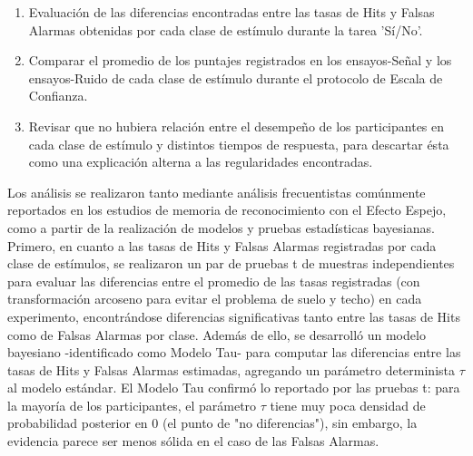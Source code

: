 \begin{enumerate}
	\item Evaluación de las diferencias encontradas entre las tasas de Hits y Falsas Alarmas obtenidas por cada clase de estímulo durante la tarea 'Sí/No'.\\
	\item Comparar el promedio de los puntajes registrados en los ensayos-Señal y los ensayos-Ruido de cada clase de estímulo durante el protocolo de Escala de Confianza.\\
	\item Revisar que no hubiera relación entre el desempeño de los participantes en cada clase de estímulo y distintos tiempos de respuesta, para descartar ésta como una explicación alterna a las regularidades encontradas.\\
\end{enumerate}

Los análisis se realizaron tanto mediante análisis frecuentistas comúnmente reportados en los estudios de memoria de reconocimiento con el Efecto Espejo, como a partir de la realización de modelos y pruebas estadísticas bayesianas.\\

Primero, en cuanto a las tasas de Hits y Falsas Alarmas registradas por cada clase de estímulos, se realizaron un par de pruebas t de muestras independientes para evaluar las diferencias entre el promedio de las tasas registradas (con transformación arcoseno para evitar el problema de suelo y techo) en cada experimento, encontrándose diferencias significativas tanto entre las tasas de Hits como de Falsas Alarmas por clase. Además de ello, se desarrolló un modelo bayesiano -identificado como Modelo Tau- para computar las diferencias entre las tasas de Hits y Falsas Alarmas estimadas, agregando un parámetro determinista $\tau$ al modelo estándar. El Modelo Tau confirmó lo reportado por las pruebas t: para la mayoría de los participantes, el parámetro $\tau$ tiene muy poca densidad de probabilidad posterior en $0$ (el punto de "no diferencias"), sin embargo, la evidencia parece ser menos sólida en el caso de las Falsas Alarmas. \\ %

